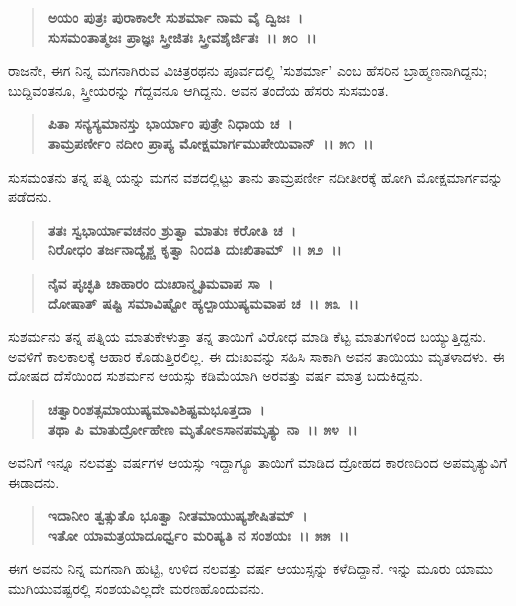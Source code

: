\begin{verse}
\textbf{ಅಯಂ ಪುತ್ರಃ ಪುರಾಕಾಲೇ ಸುಶರ್ಮಾ ನಾಮ ವೈ ದ್ವಿಜಃ~।}\\\textbf{ಸುಸಮಂತಾತ್ಮಜಃ ಪ್ರಾಜ್ಞಃ ಸ್ತ್ರೀಜಿತಃ ಸ್ತ್ರೀವಶೈರ್ಜಿತಃ~।। ೫೦~।।}
\end{verse}

ರಾಜನೇ, ಈಗ ನಿನ್ನ ಮಗನಾಗಿರುವ ವಿಚಿತ್ರರಥನು ಪೂರ್ವದಲ್ಲಿ 'ಸುಶರ್ಮಾ' ಎಂಬ ಹೆಸರಿನ ಬ್ರಾಹ್ಮಣನಾಗಿದ್ದನು; ಬುದ್ದಿವಂತನೂ, ಸ್ತ್ರೀಯರನ್ನು ಗೆದ್ದವನೂ ಆಗಿದ್ದನು. ಅವನ ತಂದೆಯ ಹೆಸರು ಸುಸಮಂತ.

\begin{verse}
\textbf{ಪಿತಾ ಸನ್ಯಸ್ಯಮಾನಸ್ತು ಭಾರ್ಯಾಂ ಪುತ್ರೇ ನಿಧಾಯ ಚ~।}\\\textbf{ತಾಮ್ರಪರ್ಣೀಂ ನದೀಂ ಪ್ರಾಪ್ಯ ಮೋಕ್ಷಮಾರ್ಗಮುಪೇಯಿವಾನ್~।। ೫೧~।।}
\end{verse}

ಸುಸಮಂತನು ತನ್ನ ಪತ್ನಿ ಯನ್ನು ಮಗನ ವಶದಲ್ಲಿಟ್ಟು ತಾನು ತಾಮ್ರಪರ್ಣೀ ನದೀತೀರಕ್ಕೆ ಹೋಗಿ ಮೋಕ್ಷಮಾರ್ಗವನ್ನು ಪಡೆದನು.

\begin{verse}
\textbf{ತತಃ ಸ್ವಭಾರ್ಯಾವಚನಂ ಶ್ರುತ್ವಾ ಮಾತುಃ ಕರೋತಿ ಚ~।}\\\textbf{ನಿರೋಧಂ ತರ್ಜನಾದ್ಯೈಶ್ಚ ಕೃತ್ವಾ ನಿಂದತಿ ದುಃಖಿತಾಮ್~।। ೫೨~।। }
\end{verse}

\begin{verse}
\textbf{ನೈವ ಪೃಚ್ಛತಿ ಚಾಹಾರಂ ದುಃಖಾನ್ಮೃತಿಮವಾಪ ಸಾ~।}\\\textbf{ದೋಷಾತ್ ಷಷ್ಟಿ ಸಮಾವಿಷ್ಟೋ ಹ್ಯಲ್ಪಾಯುಷ್ಯಮವಾಪ ಚ~।। ೫೩~।।}
\end{verse}

ಸುಶರ್ಮನು ತನ್ನ ಪತ್ನಿಯ ಮಾತುಕೇಳುತ್ತಾ ತನ್ನ ತಾಯಿಗೆ ವಿರೋಧ ಮಾಡಿ ಕೆಟ್ಟ ಮಾತುಗಳಿಂದ ಬಯ್ಯುತ್ತಿದ್ದನು. ಅವಳಿಗೆ ಕಾಲಕಾಲಕ್ಕೆ ಆಹಾರ ಕೊಡುತ್ತಿರಲಿಲ್ಲ. ಈ ದುಃಖವನ್ನು ಸಹಿಸಿ ಸಾಕಾಗಿ ಅವನ ತಾಯಿಯು ಮೃತಳಾದಳು. ಈ ದೋಷದ ದೆಸೆಯಿಂದ ಸುಶರ್ಮನ ಆಯಸ್ಸು ಕಡಿಮೆಯಾಗಿ ಅರವತ್ತು ವರ್ಷ ಮಾತ್ರ ಬದುಕಿದ್ದನು.

\begin{verse}
\textbf{ಚತ್ವಾರಿಂಶತ್ಸಮಾಯುಷ್ಯಮಾವಿಶಿಷ್ಟಮಭೂತ್ತದಾ~।}\\\textbf{ತಥಾ ಪಿ ಮಾತುರ್ದ್ರೋಹೇಣ ಮೃತೋಽಸಾನಪಮೃತ್ಯು ನಾ~।। ೫೪~।।}
\end{verse}

ಅವನಿಗೆ ಇನ್ನೂ ನಲವತ್ತು ವರ್ಷಗಳ ಆಯಸ್ಸು ಇದ್ದಾಗ್ಯೂ ತಾಯಿಗೆ ಮಾಡಿದ ದ್ರೋಹದ ಕಾರಣದಿಂದ ಅಪಮೃತ್ಯುವಿಗೆ ಈಡಾದನು.

\begin{verse}
\textbf{ಇದಾನೀಂ ತ್ವತ್ಸುತೊ ಭೂತ್ವಾ ನೀತಮಾಯುಷ್ಯಶೇಷಿತಮ್~।}\\\textbf{ಇತೋ ಯಾಮತ್ರಯಾದೂರ್ಧ್ವಂ ಮರಿಷ್ಯತಿ ನ ಸಂಶಯಃ~।। ೫೫~।।}
\end{verse}

ಈಗ ಅವನು ನಿನ್ನ ಮಗನಾಗಿ ಹುಟ್ಟಿ, ಉಳಿದ ನಲವತ್ತು ವರ್ಷ ಆಯುಸ್ಸನ್ನು ಕಳೆದಿದ್ದಾನೆ. ಇನ್ನು ಮೂರು ಯಾಮು ಮುಗಿಯುವಷ್ಟರಲ್ಲಿ ಸಂಶಯವಿಲ್ಲದೇ ಮರಣಹೊಂದುವನು.

